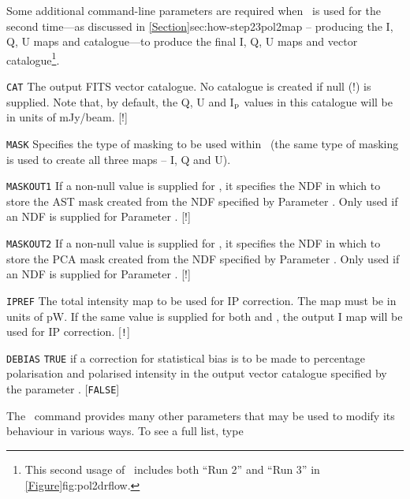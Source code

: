 Some additional command-line parameters are required when \poltwomap\ is
used for the second time---as discussed in
\cref{Section}{sec:how-step23}{pol2map -- producing the I, Q, U maps
and catalogue}---to produce the final I, Q, U maps and vector catalogue\footnote{This
second usage of \poltwomap\ includes both ``Run 2'' and ``Run 3'' in
\cref{Figure}{fig:pol2drflow}{}.}.

\begin{aligndesc}

\item[\texttt{CAT}] The output FITS vector catalogue. No catalogue is
  created if null (!) is supplied. Note that, by default, the Q, U and
  I$_{\textnormal{p}}$ values in this catalogue will be in units of mJy/beam. [!]

\item[\texttt{MASK}] Specifies the type of masking to be used within
  \makemap\ (the same type of masking is used to create all three maps --
  I, Q and U).

\item[\texttt{MASKOUT1}] If a non-null value is supplied for ,
  it specifies the NDF in which to store the AST mask created from the NDF
  specified by Parameter . Only used if an NDF is supplied for
  Parameter . [!]

\item[\texttt{MASKOUT2}] If a non-null value is supplied for ,
  it specifies the NDF in which to store the PCA mask created from the NDF
  specified by Parameter . Only used if an NDF is supplied for
  Parameter . [!]

\item[\texttt{IPREF}] The total intensity map to be used for IP
  correction. The map must be in units of pW. If the same value is
  supplied for both  and , the output I
  map will be used for IP correction. [\texttt{!}]

\item[\texttt{DEBIAS}] \texttt{TRUE} if a correction for statistical bias is to
  be made to percentage polarisation and polarised intensity in the
  output vector catalogue specified by the parameter . [\texttt{FALSE}]
\end{aligndesc}

The \poltwomap\ command provides many other parameters that may be used to
modify its behaviour in various ways. To see a full list, type

